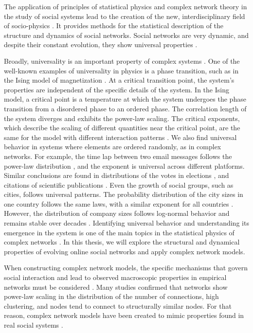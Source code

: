 The application of principles of statistical physics and complex network theory in the study of social systems lead to the creation of the new, interdisciplinary field of socio-physics \cite{sen2014sociophysics}. It provides methods for the statistical description of the structure and dynamics of social networks. Social networks are very dynamic, and despite their constant evolution, they show universal properties \cite{schweitzer2018sociophysics}.

Broadly, universality is an important property of complex systems \cite{binney1992}. One of the well-known examples of universality in physics is a phase transition, such as in the Ising model of magnetization \cite{sethna2021statistical}. At a critical transition point, the system's properties are independent of the specific details of the system. In the Ising model, a critical point is a temperature at which the system undergoes the phase transition from a disordered phase to an ordered phase. The correlation length of the system diverges and exhibits the power-law scaling. The critical exponents, which describe the scaling of different quantities near the critical point, are the same for the model with different interaction patterns \cite{kadanoff1990scaling}. 
We also find universal behavior in systems where elements are ordered randomly, as in complex networks. For example, the time lap between two email messages follows the power-law distribution \cite{garas2012emotional}, and the exponent is universal across different platforms. Similar conclusions are found in distributions of the votes in elections \cite{fortunato2007scaling, chatterjee2013}, and citations of scientific publications \cite{radicchi2008}. Even the growth of social groups, such as cities, follows universal patterns. The probability distribution of the city sizes in one country follows the same laws, with a similar exponent for all countries \cite{barthelemy2019, fazio2015pareto}. However, the distribution of company sizes follows log-normal behavior and remains stable over decades \cite{amaral1997scaling, stanley1996scaling}. Identifying universal behavior and understanding its emergence in the system is one of the main topics in the statistical physics of complex networks \cite{verbavatz2020}. %
In this thesis, we will explore the structural and dynamical properties of evolving online social networks and apply complex network models.  

When constructing complex network models, the specific mechanisms that govern social interaction and lead to observed macroscopic properties in empirical networks must be considered \cite{sen2014sociophysics}. Many studies confirmed that networks show power-law scaling in the distribution of the number of connections, high clustering, and nodes tend to connect to structurally similar nodes. For that reason, complex network models have been created to mimic properties found in real social systems \cite{sen2014sociophysics}.

